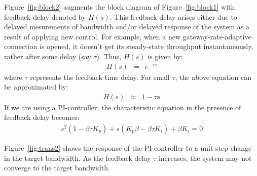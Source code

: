 \documentclass{article}
\begin{document}
Figure~\ref{fig:block2} augments the block diagram
of Figure~\ref{fig:block1}
with feedback delay denoted by $H(s)$. 
This feedback
delay arises either due to delayed
mesurements of bandwidth and/or
delayed response of the system as a result of
applying new control.
For example, when 
a new gateway-rate-adaptive connection is opened, 
it doesn't get its steady-state throughput instantaneously,
rather after some delay (say $\tau$). Thus, $H(s)$ is given by:
\begin{eqnarray*} 
 \label{eqn:hs}    
   H(s) &=& e^{-\tau s}
\end{eqnarray*}
where $\tau$ represents the feedback time delay.
For small $\tau$, the above
equation can be approximated by:
\begin{eqnarray*} 
 \label{eqn:ahs}    
   H(s) &\approx& 1 - \tau s
\end{eqnarray*}
If we are using a PI-controller, the characteristic equation in 
the presence
of feedback delay becomes:
\begin{eqnarray*} 
 \label{eqn:cch}    
    s^2(1-\beta \tau K_p) + s(K_p\beta - \beta \tau K_i) + \beta K_i = 0
\end{eqnarray*}


Figure~\ref{fig:trans2} shows the response
of the PI-controller to a unit step change in the target bandwidth.
As the feedback delay $\tau$ increases,
the system may not converge to the target bandwidth.
\end{document}
